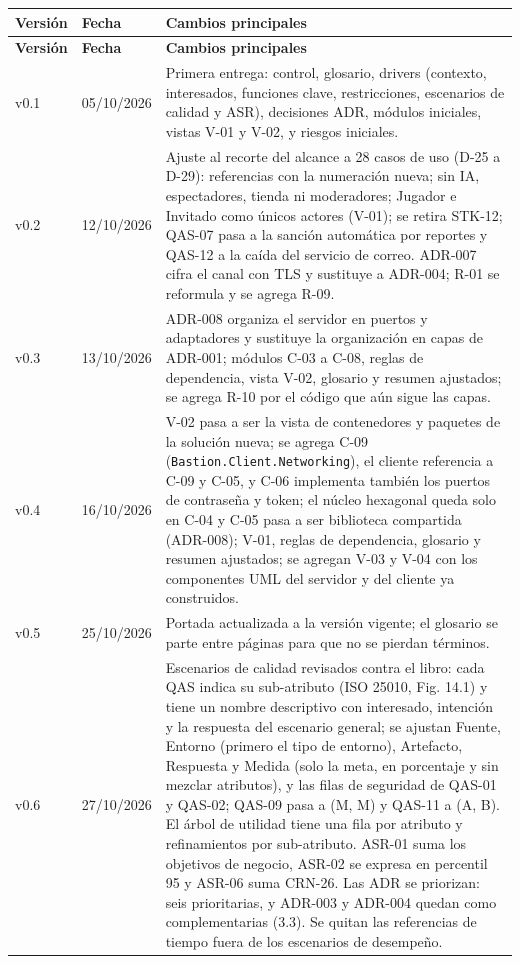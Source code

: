\documentclass[11pt,letterpaper]{article}
\newcommand{\hd}[1]{\textbf{\small #1}}
\newcommand{\headrow}{\rowcolor{SADHead}}
\begin{document}
\medskip
\begin{xltabular}{\linewidth}{|p{2.6cm}|p{3cm}|Y|}\hline
  \headrow\hd{Versión} & \hd{Fecha} & \hd{Cambios principales}\\\hline
  \endfirsthead
  \headrow\hd{Versión} & \hd{Fecha} & \hd{Cambios principales}\\\hline
  \endhead
  v0.1 & 05/10/2026 & Primera entrega: control, glosario, drivers (contexto, interesados, funciones clave, restricciones, escenarios de calidad y ASR), decisiones ADR, módulos iniciales, vistas V-01 y V-02, y riesgos iniciales.\\\hline
  v0.2 & 12/10/2026 & Ajuste al recorte del alcance a 28 casos de uso (D-25 a D-29): referencias con la numeración nueva; sin IA, espectadores, tienda ni moderadores; Jugador e Invitado como únicos actores (V-01); se retira STK-12; QAS-07 pasa a la sanción automática por reportes y QAS-12 a la caída del servicio de correo. ADR-007 cifra el canal con TLS y sustituye a ADR-004; R-01 se reformula y se agrega R-09.\\\hline
  v0.3 & 13/10/2026 & ADR-008 organiza el servidor en puertos y adaptadores y sustituye la organización en capas de ADR-001; módulos C-03 a C-08, reglas de dependencia, vista V-02, glosario y resumen ajustados; se agrega R-10 por el código que aún sigue las capas.\\\hline
  v0.4 & 16/10/2026 & V-02 pasa a ser la vista de contenedores y paquetes de la solución nueva; se agrega C-09 (\texttt{Bastion.Client.Networking}), el cliente referencia a C-09 y C-05, y C-06 implementa también los puertos de contraseña y token; el núcleo hexagonal queda solo en C-04 y C-05 pasa a ser biblioteca compartida (ADR-008); V-01, reglas de dependencia, glosario y resumen ajustados; se agregan V-03 y V-04 con los componentes UML del servidor y del cliente ya construidos.\\\hline
  v0.5 & 25/10/2026 & Portada actualizada a la versión vigente; el glosario se parte entre páginas para que no se pierdan términos.\\\hline
  v0.6 & 27/10/2026 & Escenarios de calidad revisados contra el libro: cada QAS indica su sub-atributo (ISO 25010, Fig. 14.1) y tiene un nombre descriptivo con interesado, intención y la respuesta del escenario general; se ajustan Fuente, Entorno (primero el tipo de entorno), Artefacto, Respuesta y Medida (solo la meta, en porcentaje y sin mezclar atributos), y las filas de seguridad de QAS-01 y QAS-02; QAS-09 pasa a (M, M) y QAS-11 a (A, B). El árbol de utilidad tiene una fila por atributo y refinamientos por sub-atributo. ASR-01 suma los objetivos de negocio, ASR-02 se expresa en percentil 95 y ASR-06 suma CRN-26. Las ADR se priorizan: seis prioritarias, y ADR-003 y ADR-004 quedan como complementarias (3.3). Se quitan las referencias de tiempo fuera de los escenarios de desempeño.\\\hline

\end{xltabular}
\end{document}
